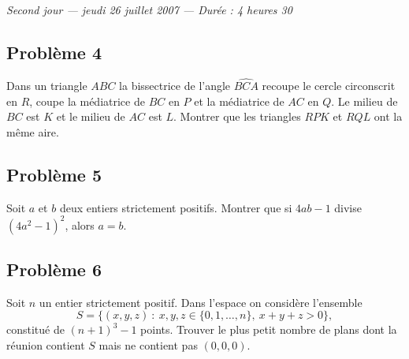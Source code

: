 \bigskip
\begin{center}
  \emph{Second jour --- jeudi 26 juillet 2007 --- Durée : 4 heures 30}
\end{center}

\subsection*{Problème 4}
Dans un triangle $ABC$ la bissectrice de l'angle $\widehat{BCA}$ recoupe le cercle circonscrit en $R$, coupe la
médiatrice de $BC$ en $P$ et la médiatrice de $AC$ en $Q$. Le milieu de $BC$ est $K$ et le milieu de $AC$ est
$L$. Montrer que les triangles $RPK$ et $RQL$ ont la même aire.

\subsection*{Problème 5}
Soit $a$ et $b$ deux entiers strictement positifs. Montrer que si $4ab - 1$ divise $(4a^2 - 1)^2$, alors
$a = b$.

\subsection*{Problème 6}
Soit $n$ un entier strictement positif. Dans l'espace on considère l'ensemble
\[
S = \bigl\{(x, y, z) \ : \ x, y, z \in \{0, 1, \ldots, n\},\ x + y + z > 0\bigr\},
\]
constitué de $(n + 1)^3 - 1$ points. Trouver le plus petit nombre de plans dont la réunion contient $S$ mais ne
contient pas $(0, 0, 0)$.
